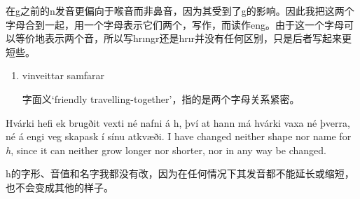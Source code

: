 \begin{translation*}{}
    在g之前的n发音更偏向于喉音而非鼻音，因为其受到了g的影响。因此我把这两个字母合到一起，用一个字母表示它们两个，写作\textcrg ，而读作eng。由于这一个字母可以等价地表示两个音，所以写hrıngr还是hrı\textcrg r并没有任何区别，只是后者写起来更短些。
\end{translation*}
\begin{grammar*}{}
    \begin{enumerate}[leftmargin=*]
        \item vinveittar samfarar

              字面义`friendly travelling-together'，指的是两个字母关系紧密。
    \end{enumerate}
\end{grammar*}
\begin{paracol}{2}
    Hvárki hefi ek brugðit vexti né nafni á h, því at hann má hvárki vaxa né þverra, né á engi veg skapask í sínu atkvæði.
    \switchcolumn
    I have changed neither shape nor name for \textit{h}, since it can neither grow longer nor shorter, nor in any way be changed.
\end{paracol}
\begin{translation*}{}
    h的字形、音值和名字我都没有改，因为在任何情况下其发音都不能延长或缩短，也不会变成其他的样子。
\end{translation*}

